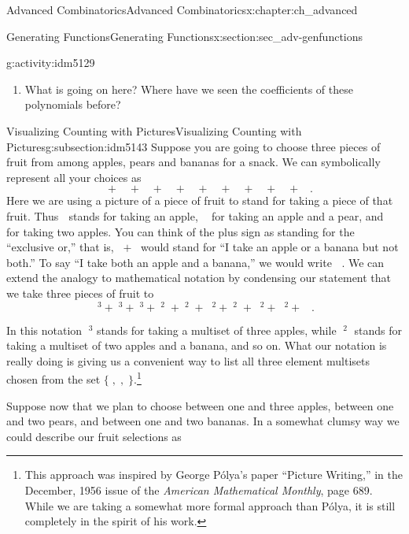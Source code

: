 \documentclass[oneside,10pt,]{book}
\numberwithin{equation}{chapter}
\newcommand{\apple}{\text{🍎}}
\newcommand{\ap}{\apple}
\newcommand{\banana}{\text{🍌}}
\newcommand{\ba}{\banana}
\newcommand{\pear}{\text{🍐}}
\newcommand{\pe}{\pear}
\begin{document}
\begin{chapterptx}{Advanced Combinatorics}{}{Advanced Combinatorics}{}{}{x:chapter:ch_advanced}
\begin{sectionptx}{Generating Functions}{}{Generating Functions}{}{}{x:section:sec_adv-genfunctions}
\begin{introduction}{}
\begin{activity}{}{g:activity:idm5129}
\begin{enumerate}[font=\bfseries,label=(\alph*),ref=\alph*]
\item{}What is going on here?  Where have we seen the coefficients of these polynomials before?%
\end{enumerate}
\end{activity}
\end{introduction}%
%
%
\typeout{************************************************}
\typeout{************************************************}
%
\begin{subsectionptx}{Visualizing Counting with Pictures}{}{Visualizing Counting with Pictures}{}{}{g:subsection:idm5143}
Suppose you are going to choose three pieces of fruit from among apples, pears and bananas for a snack.  We can symbolically represent all your choices as%
\begin{equation*}
\ap\ap\ap+\pe\pe\pe+\ba\ba\ba+\ap\ap\pe+\ap\ap\ba+\ap\pe\pe +\pe\pe\ba
+\ap\ba\ba+\pe\ba\ba+\ap\pe\ba.
\end{equation*}
Here we are using a picture of a piece of fruit to stand for taking a piece of that fruit. Thus \(\ap\) stands for taking an apple, \(\ap\pe\) for taking an apple and a pear, and \(\ap\ap\) for taking two apples.  You can think of the plus sign as standing for the ``exclusive or,'' that is, \(\ap+\ba\) would stand for ``I take an apple or a banana but not both.'' To say ``I take both an apple and a banana,'' we would write \(\ap\ba\). We can extend the analogy to mathematical notation by condensing our statement that we take three pieces of fruit to%
\begin{equation*}
\ap^3+\pe^3+\ba^3+\ap^2\pe+\ap^2\ba +\ap\pe^2+\pe^2\ba+
\ap\ba^2+\pe\ba^2 +\ap\pe\ba.
\end{equation*}
%
\par
In this notation \(\ap^3\) stands for taking a multiset of three apples, while \(\ap^2\ba\) stands for taking a multiset of two apples and a banana, and so on. What our notation is really doing is giving us a convenient way to list all three element multisets chosen from the set \(\{\ap,\pe,\ba\}\).\footnote{This approach was inspired by George Pólya's paper ``Picture Writing,'' in the December, 1956 issue of the \textsl{American Mathematical Monthly}, page 689. While we are taking a somewhat more formal approach than Pólya, it is still completely in the spirit of his work.\label{g:fn:idm5160}}%
\par
Suppose now that we plan to choose between one and three apples, between one and two pears, and between one and two bananas. In a somewhat clumsy way we could describe our fruit selections as%

\end{subsectionptx}
\end{sectionptx}
\end{chapterptx}
\end{document}
